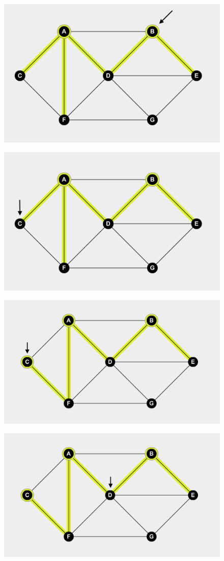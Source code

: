\begin{homeworkProblem}
\begin{enumerate}[a)]
\vspace*{3cm}

    \begin{figure}[ht]
\centering
\begin{minipage}{.5\textwidth}
  \centering
  \includegraphics[width=.4\linewidth]{q3-b2}
  \label{fig:test5}
\end{minipage}%
\begin{minipage}{.5\textwidth}
  \centering
  \includegraphics[width=.4\linewidth]{q3-c1}
  \label{fig:test6}
\end{minipage}
\end{figure}

\vspace*{3cm}

    \begin{figure}[ht]
\centering
\begin{minipage}{.5\textwidth}
  \centering
  \includegraphics[width=.4\linewidth]{q3-c2}
  \label{fig:test7}
\end{minipage}%
\begin{minipage}{.5\textwidth}
  \centering
  \includegraphics[width=.4\linewidth]{q3-d1}
  \label{fig:test8}
\end{minipage}
\end{figure}


\end{enumerate}
\end{homeworkProblem}
